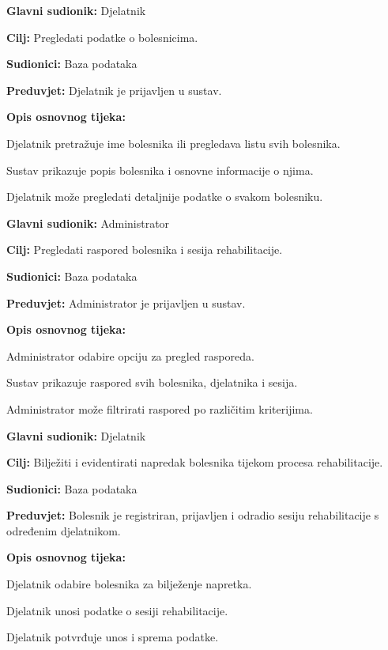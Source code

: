 	\item \textbf{Glavni sudionik:} Djelatnik
	\item \textbf{Cilj:} Pregledati podatke o bolesnicima.
	\item \textbf{Sudionici:} Baza podataka
	\item \textbf{Preduvjet:} Djelatnik je prijavljen u sustav.
	\item \textbf{Opis osnovnog tijeka:}
	\begin{packed_enum}
		\item Djelatnik pretražuje ime bolesnika ili pregledava listu svih bolesnika.
		\item Sustav prikazuje popis bolesnika i osnovne informacije o njima.
		\item Djelatnik može pregledati detaljnije podatke o svakom bolesniku.
	\end{packed_enum}
\closeusecase


	\item \textbf{Glavni sudionik:} Administrator
	\item \textbf{Cilj:} Pregledati raspored bolesnika i sesija rehabilitacije.
	\item \textbf{Sudionici:} Baza podataka
	\item \textbf{Preduvjet:} Administrator je prijavljen u sustav.
	\item \textbf{Opis osnovnog tijeka:}
	\begin{packed_enum}
		\item Administrator odabire opciju za pregled rasporeda.
		\item Sustav prikazuje raspored svih bolesnika, djelatnika i sesija.
		\item Administrator može filtrirati raspored po različitim kriterijima.
	\end{packed_enum}
\closeusecase


	\item \textbf{Glavni sudionik:} Djelatnik
	\item \textbf{Cilj:} Bilježiti i evidentirati napredak bolesnika tijekom procesa rehabilitacije.
	\item \textbf{Sudionici:} Baza podataka
	\item \textbf{Preduvjet:} Bolesnik je registriran, prijavljen i odradio sesiju rehabilitacije s određenim djelatnikom.
	\item \textbf{Opis osnovnog tijeka:}
	\begin{packed_enum}
		\item Djelatnik odabire bolesnika za bilježenje napretka.
		\item Djelatnik unosi podatke o sesiji rehabilitacije.
		\item Djelatnik potvrđuje unos i sprema podatke.
	\end{packed_enum}
\closeusecase


